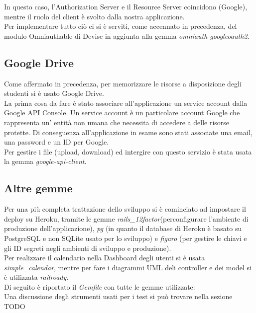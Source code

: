\documentclass[Lau, binding=0.6cm, oneside]{sapthesis}
\begin{document}
In questo caso, l’Authorization Server e il Resource Server coincidono (Google), mentre il ruolo del client è svolto dalla nostra applicazione.\\
Per implementare tutto ciò ci si è serviti, come accennato in precedenza, del modulo Omniauthable di Devise in aggiunta alla gemma \textit{omniauth-googleoauth2}.

\subsection{Google Drive}

Come affermato in precedenza, per memorizzare le risorse a disposizione degli studenti si è usato Google Drive.\\
La prima cosa da fare è stato associare all'applicazione un service account dalla Google API Console. Un service account è un particolare account Google che rappresenta un' entità non umana che necessita di accedere a delle risorse protette. Di conseguenza all'applicazione in esame sono stati associate una email, una password e un ID per Google.\\
Per gestire i file (upload, download) ed intergire con questo servizio è stata usata la gemma \textit{google-api-client}.

\subsection{Altre gemme}

Per una più completa trattazione dello sviluppo si è cominciato ad impostare il deploy su Heroku, tramite le gemme \textit{rails\_12factor}(perconfigurare l'ambiente di produzione dell'applicazione), \textit{pg} (in quanto il database di Heroku è basato su PostgreSQL e non SQLite usato per lo sviluppo) e \textit{figaro} (per gestire le chiavi e gli ID segreti negli ambienti di sviluppo e produzione).\\
Per realizzare il calendario nella Dashboard degli utenti si è usata \textit{simple\_calendar}, mentre per fare i diagrammi UML deli controller e dei model si è utilizzata \textit{railroady}.\\
Di seguito è riportato il \textit{Gemfile} con tutte le gemme utilizzate:\\



Una discussione degli strumenti usati per i test si può trovare nella sezione TODO\\
\end{document}
